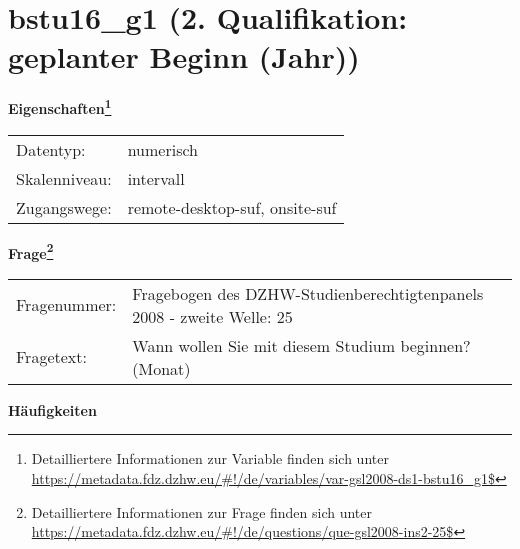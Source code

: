 
    \setcounter{footnote}{0}

    \vspace*{-1.8cm}
	\section{bstu16\_g1 (2. Qualifikation: geplanter Beginn (Jahr))}
	\label{section:bstu16_g1}



    \vspace*{0.5cm}
    \noindent\textbf{Eigenschaften\footnote{Detailliertere Informationen zur Variable finden sich unter
		\url{https://metadata.fdz.dzhw.eu/\#!/de/variables/var-gsl2008-ds1-bstu16_g1$}}}\\
	\begin{tabularx}{\hsize}{@{}lX}
	Datentyp: & numerisch \\
	Skalenniveau: & intervall \\
	Zugangswege: &
	  remote-desktop-suf, 
	  onsite-suf
 \\
    \end{tabularx}



				\vspace*{0.5cm}
                \noindent\textbf{Frage\footnote{Detailliertere Informationen zur Frage finden sich unter
		              \url{https://metadata.fdz.dzhw.eu/\#!/de/questions/que-gsl2008-ins2-25$}}}\\
				\begin{tabularx}{\hsize}{@{}lX}
					Fragenummer: &
					  Fragebogen des DZHW-Studienberechtigtenpanels 2008 - zweite Welle:
					  25
 \\
					Fragetext: & Wann wollen Sie mit diesem Studium beginnen? (Monat) \\
				\end{tabularx}





        		\vspace*{0.5cm}
                \noindent\textbf{Häufigkeiten}

